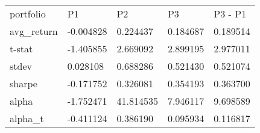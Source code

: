 \begin{tabular}{lllll}
\toprule
\midrule
portfolio & P1 & P2 & P3 & P3 - P1 \\
avg_return & -0.004828 & 0.224437 & 0.184687 & 0.189514 \\
t-stat & -1.405855 & 2.669092 & 2.899195 & 2.977011 \\
stdev & 0.028108 & 0.688286 & 0.521430 & 0.521074 \\
sharpe & -0.171752 & 0.326081 & 0.354193 & 0.363700 \\
alpha & -1.752471 & 41.814535 & 7.946117 & 9.698589 \\
alpha_t & -0.411124 & 0.386190 & 0.095934 & 0.116817 \\
\bottomrule
\end{tabular}
